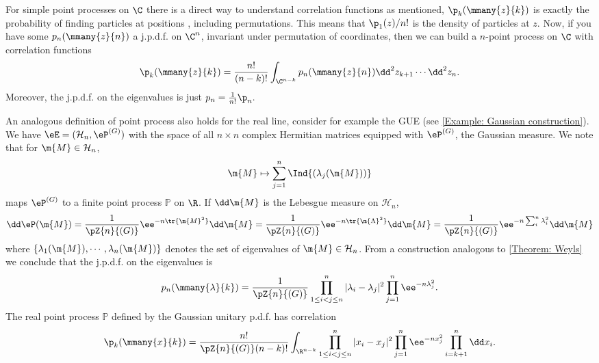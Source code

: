 For simple point processes on $\C$ there is a direct way to understand correlation functions as mentioned, $\p_k(\mmany{z}{k})$ is exactly the probability of finding particles at positions , including permutations. This means that $\p_1(z)/n!$ is the density of particles at $z$. Now, if you have some $p_n(\mmany{z}{n})$ a j.p.d.f. on $\C^n$, invariant under permutation of coordinates, then we can build a $n$-point process on $\C$ with correlation functions
\begin{equation} \label{Equation: Correlation functions}
	\p_k(\mmany{z}{k}) = \frac{n!}{(n-k)!} \int_{\C^{n-k}} p_n(\mmany{z}{n}) \dd^2 z_{k+1} \cdots \dd^2 z_n.
	\label{Equation: Symmetric correlation}
\end{equation} 
Moreover, the j.p.d.f. on the eigenvalues is just
$
	p_n = \frac{1}{n!} \p_n.
$

\begin{exemplo} \label{Exemplo: Gaussian density}
	An analogous definition of point process also holds for the real line, consider for example the GUE (see \autoref{Example: Gaussian construction}). We have $\eE = (\mathcal{H}_n, \eP^{(G)})$ with the space of all $n\times n$ complex Hermitian matrices equipped with $\eP^{(G)}$, the Gaussian measure. We note that for $\m{M} \in \mathcal{H}_n$,
	\begin{equation}
		\m{M} \mapsto \sum_{j=1}^{n} \Ind{(\lambda_j(\m{M}))}
	\end{equation}
	maps $\eP^{(G)}$ to a finite point process $\mathbb{P}$ on $\R$. If $\dd \m{M}$ is the Lebesgue measure on $\mathcal{H}_n$,
	\begin{equation}
		\dd \eP(\m{M}) = \frac{1}{\pZ{n}{(G)}} \ee^{-n\tr{\m{M}^2}} \dd \m{M} = \frac{1}{\pZ{n}{(G)}} \ee^{-n\tr{\m{\Lambda}^2}} \dd \m{M} = \frac{1}{\pZ{n}{(G)}} \ee^{- n \sum_i^n \lambda_i^2} \dd \m{M}
	\end{equation}
	where $\{\lambda_1(\m{M}), \cdots, \lambda_n(\m{M}) \}$ denotes the set of eigenvalues of $\m{M} \in \mathcal{H}_n$. From a construction analogous to \autoref{Theorem: Weyls} we conclude that the j.p.d.f. on the eigenvalues is 
	\begin{equation}
		p_n(\mmany{\lambda}{k}) = \frac{1}{\pZ{n}{(G)}}  \prod_{1 \leq i < j \leq n}^n |\lambda_i - \lambda_j|^2 \prod_{j=1}^{n} \ee^{-n \lambda^2_j}.
	\end{equation}
	The real point process $\mathbb{P}$ defined by the Gaussian unitary p.d.f. has correlation
	\begin{equation}
		\p_k(\mmany{x}{k}) = \frac{n!}{\pZ{n}{(G)} (n-k)!} \int_{\R^{n-k}} \prod_{1 \leq i < j \leq n}^n |x_i - x_j|^2 \prod_{j=1}^{n} \ee^{-n x^2_j} \prod_{i=k+1}^{n} \dd x_i.
	\end{equation}
\end{exemplo}

